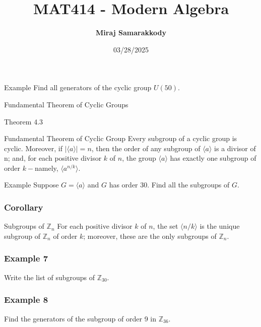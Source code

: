 \documentclass{beamer}
\title{MAT414 - Modern Algebra}
\author{\textbf{Miraj Samarakkody}}
\institute{Tougaloo College}
\date{03/28/2025}
\begin{document}
\begin{frame}
    \titlepage
\end{frame}

    \begin{frame}{Example}
    Find all generators of the cyclic group \(U(50)\).
    \end{frame}

    \begin{frame}{}
    \begin{center}
        \Huge{Fundamental Theorem of Cyclic Groups}
    \end{center}
    \end{frame}

    \begin{frame}{Theorem 4.3}
    \begin{block}{Fundamental Theorem of Cyclic Group}
        Every subgroup of a cyclic group is cyclic. Moreover, if \(|\langle a \rangle|=n\), then  the order of any subgroup of \(\langle a\rangle\) is a divisor of n; and, for each positive divisor \(k\) of \(n\), the group \(\langle a\rangle\) has exactly one subgroup of order \(k-\)namely, \(\langle a^{n/k}\rangle\). 
    \end{block}
    \end{frame}

    \begin{frame}{Example}
        Suppose \(G=\langle a\rangle\) and \(G\) has order 30. Find all the subgroups of \(G\).
    
    \end{frame}

    \begin{frame}
        \frametitle{Corollary}
        \begin{block}{Subgroups of \(\mathbb{Z}_n\)}
        For each positive divisor \(k\) of \(n\), the set \(\langle n/k\rangle\) is the unique subgroup of \(\mathbb{Z}_n\) of order \(k\); moreover, these are the only subgroups of \(\mathbb{Z}_n\).    
        \end{block}
    \end{frame}

    \begin{frame}
        \frametitle{Example 7}
    Write the list of subgroups of \(\mathbb{Z}_{30}\). 
    \end{frame}

\begin{frame}
    \frametitle{Example 8}
Find the generators of the subgroup of order 9 in \(\mathbb{Z}_{36}\). 
    

\end{frame}
\end{document}
